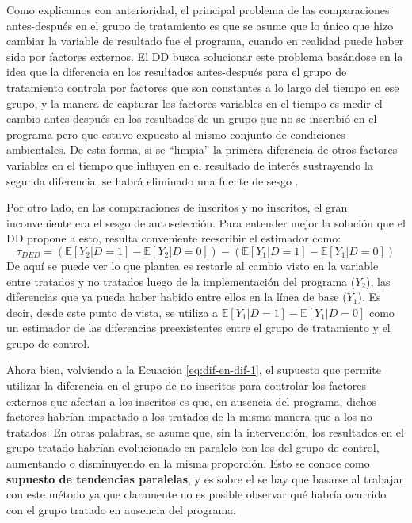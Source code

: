 \documentclass[../../main.tex]{subfiles}
\begin{document}
Como explicamos con anterioridad, el principal problema de las comparaciones antes-después
en el grupo de tratamiento es que se asume que lo único que hizo cambiar la variable de
resultado fue el programa, cuando en realidad puede haber sido por factores externos. El
DD busca solucionar este problema basándose en la idea que la diferencia en los resultados
antes-después para el grupo de tratamiento controla por factores que son constantes a lo
largo del tiempo en ese grupo, y la manera de capturar los factores variables en el tiempo
es medir el cambio antes-después en los resultados de un grupo que no se inscribió en el
programa pero que estuvo expuesto al mismo conjunto de condiciones ambientales. De esta
forma, si se ``limpia'' la primera diferencia de otros factores variables en el tiempo que
influyen en el resultado de interés sustrayendo la segunda diferencia, se habrá eliminado
una fuente de sesgo \cite{gertler-2016}.

Por otro lado, en las comparaciones de inscritos y no inscritos, el gran inconveniente era
el sesgo de autoselección. Para entender mejor la solución que el DD propone a esto,
resulta conveniente reescribir el estimador como:
\begin{equation}
    \tau_{DED} = 
        \left(
            \mathbb{E}\left[Y_2|D=1\right] - \mathbb{E}\left[Y_2|D=0\right]
        \right) -
        \left(
            \mathbb{E}\left[Y_1|D=1\right] - \mathbb{E}\left[Y_1|D=0\right]
        \right)
        \label{eq:dif-en-dif-2}
\end{equation}
De aquí se puede ver lo que plantea es restarle al cambio visto en la variable entre
tratados y no tratados luego de la implementación del programa (\(Y_2\)), las diferencias
que ya pueda haber habido entre ellos en la línea de base (\(Y_1\)). Es decir, desde este
punto de vista, se utiliza a \(\mathbb{E}\left[Y_1|D=1\right] -
\mathbb{E}\left[Y_1|D=0\right]\) como un estimador de las diferencias preexistentes entre
el grupo de tratamiento y el grupo de control.

Ahora bien, volviendo a la Ecuación \ref{eq:dif-en-dif-1}, el supuesto que permite
utilizar la diferencia en el grupo de no inscritos para controlar los factores externos
que afectan a los inscritos es que, en ausencia del programa, dichos factores habrían
impactado a los tratados de la misma manera que a los no tratados. En otras palabras, se
asume que, sin la intervención, los resultados en el grupo tratado habrían evolucionado en
paralelo con los del grupo de control, aumentando o disminuyendo en la misma proporción.
Esto se conoce como \textbf{supuesto de tendencias paralelas}, y es sobre el se hay que
basarse al trabajar con este método ya que claramente no es posible observar qué habría
ocurrido con el grupo tratado en ausencia del programa.
\end{document}
